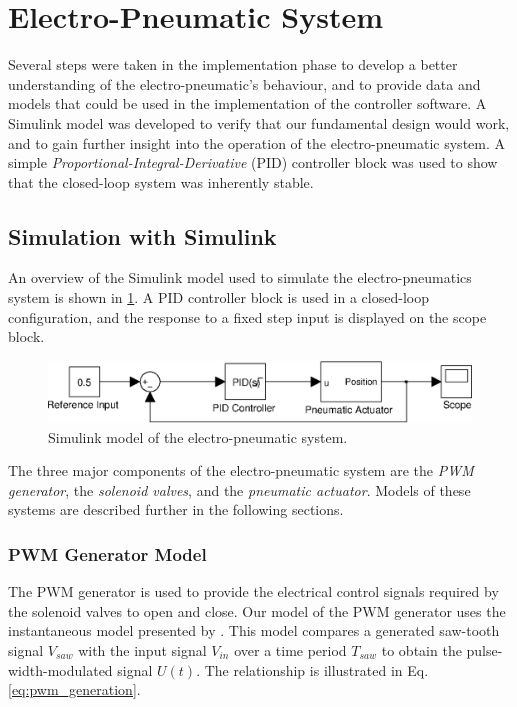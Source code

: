 \section{Electro-Pneumatic System\label{sec:electropneumatic_implementation}}


Several steps were taken in the implementation phase to develop a better understanding of the electro-pneumatic's behaviour, and to provide data and models that could be used in the implementation of the controller software. A Simulink model was developed to verify that our fundamental design would work, and to gain further insight into the operation of the electro-pneumatic system. A simple \emph{Proportional-Integral-Derivative} (PID) controller block was used to show that the closed-loop system was inherently stable.

\subsection{Simulation with Simulink}

An overview of the Simulink model used to simulate the electro-pneumatics system is shown in \ref{fig:pneumatics_top_level}. A PID controller block is used in a closed-loop configuration, and the response to a fixed step input is displayed on the scope block. 

\begin{figure}[H]
\centering
\includegraphics[scale=1]{implementation/figures/pneumatic_modelling1.eps}
\caption{Simulink model of the electro-pneumatic system.}
\label{fig:pneumatics_top_level}
\end{figure}

The three major components of the electro-pneumatic system are the \emph{PWM generator}, the \emph{solenoid valves}, and the \emph{pneumatic actuator}. Models of these systems are described further in the following sections.

\subsubsection{PWM Generator Model}

The PWM generator is used to provide the electrical control signals required by the solenoid valves to open and close. Our model of the PWM generator uses the instantaneous model presented by \citet{valve_models}. This model compares a generated saw-tooth signal $V_{saw}$ with the input signal $V_{in}$ over a time period $T_{saw}$ to obtain the pulse-width-modulated signal $U(t)$. The relationship is illustrated in Eq. \ref{eq:pwm_generation}.

